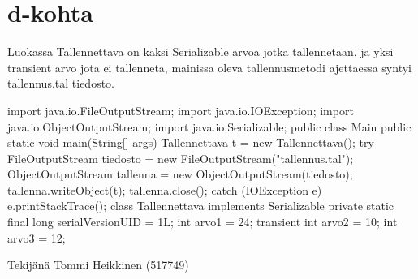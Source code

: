 \section{d-kohta}
\label{d-kohta}
Luokassa Tallennettava on kaksi Serializable arvoa jotka tallennetaan, ja yksi transient
arvo jota ei tallenneta, mainissa oleva tallennusmetodi ajettaessa syntyi tallennus.tal
tiedosto.
\begin{javacode}
import java.io.FileOutputStream;
import java.io.IOException;
import java.io.ObjectOutputStream;
import java.io.Serializable;
public class Main {
  public static void main(String[] args) {
    Tallennettava t = new Tallennettava();
    try {
      FileOutputStream tiedosto = new FileOutputStream("tallennus.tal");
      ObjectOutputStream tallenna = new ObjectOutputStream(tiedosto);
      tallenna.writeObject(t);
      tallenna.close();
    } catch (IOException e) {
      e.printStackTrace();
    }
  }
}
class Tallennettava implements Serializable{
  private static final long serialVersionUID = 1L;
  int arvo1 = 24;
  transient int arvo2 = 10;
  int arvo3 = 12;
}
\end{javacode}


Tekijänä Tommi Heikkinen (517749)
